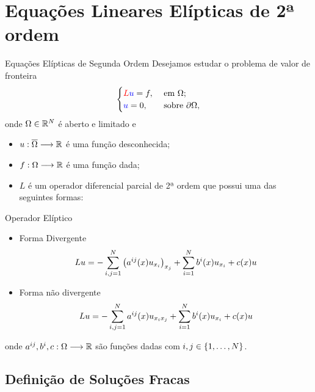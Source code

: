 \section{Equações Lineares Elípticas de 2ª ordem}



\begin{frame}{Equações Elípticas de Segunda Ordem}
Desejamos estudar o problema de valor de fronteira
\[
\begin{cases}
{\color{red}L}{\color{blue}u}=f, & \text{ em } \Omega;\\
{\color{blue}u}=0, & \text{ sobre } \partial \Omega,
\end{cases}
\]
onde \(\Omega\in \mathbb{R}^N\) é aberto e limitado e 
\begin{itemize}
\item {\color{blue}\(u:\overline{\Omega}\longrightarrow \mathbb{R}\)}
é uma função desconhecida;
\item \(f:\Omega \longrightarrow \mathbb{R}\) é uma função dada;
\item {\color{red}\(L\)} é um operador diferencial parcial de 2ª ordem que possui uma das seguintes formas:
\end{itemize}
\end{frame}

\begin{frame}{Operador Elíptico}
\begin{itemize}
\item Forma Divergente
{\color{red}
\[
Lu=-\sum_{i,j=1}^{N}\left(a^{ij}(x)u_{x_i}\right)_{x_j}+\sum_{i=1}^{N}b^i(x)u_{x_i}+c(x)u
\]
}
\item Forma não divergente
{\color{red}
\[
Lu=-\sum_{i,j=1}^{N}a^{ij}(x)u_{x_ix_j}+\sum_{i=1}^{N}b^i(x)u_{x_i}+c(x)u
\]
}
\end{itemize}
onde \(a^{ij},b^i, c :\Omega \longrightarrow \mathbb{R}\) são funções dadas com \(i,j\in \{1,\ldots,N\}\).
\end{frame}
\subsection*{Definição de Soluções Fracas}

